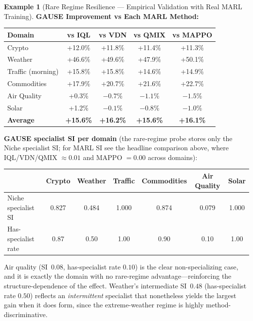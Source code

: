 \documentclass[11pt,a4paper]{article}
\theoremstyle{definition}
\newtheorem{example}{Example}[section]
\theoremstyle{plain}
\begin{document}
\begin{example}[Rare Regime Resilience --- Empirical Validation with Real MARL Training]
\textbf{GAUSE Improvement vs Each MARL Method:}
\begin{center}
\begin{tabular}{lcccc}
\toprule
Domain & vs IQL & vs VDN & vs QMIX & vs MAPPO \\
\midrule
Crypto & +12.0\% & +11.8\% & +11.4\% & +11.3\% \\
Weather & +46.6\% & +49.6\% & +47.9\% & +50.1\% \\
Traffic (morning) & +15.8\% & +15.8\% & +14.6\% & +14.9\% \\
Commodities & +17.9\% & +20.7\% & +21.6\% & +22.7\% \\
Air Quality & +0.3\% & $-0.7$\% & $-1.1$\% & $-1.5$\% \\
Solar & +1.2\% & $-0.1$\% & $-0.8$\% & $-1.0$\% \\
\midrule
\textbf{Average} & \textbf{+15.6\%} & \textbf{+16.2\%} & \textbf{+15.6\%} & \textbf{+16.1\%} \\
\bottomrule
\end{tabular}
\end{center}

\textbf{GAUSE specialist SI per domain} (the rare-regime probe stores
only the Niche specialist SI; for MARL SI see the headline comparison above,
where IQL/VDN/QMIX $\approx 0.01$ and MAPPO $= 0.00$ across domains):
\begin{center}
\begin{tabular}{lcccccc}
\toprule
 & Crypto & Weather & Traffic & Commodities & Air Quality & Solar \\
\midrule
Niche specialist SI & 0.827 & 0.484 & 1.000 & 0.874 & 0.079 & 1.000 \\
Has-specialist rate & 0.87 & 0.50 & 1.00 & 0.90 & 0.10 & 1.00 \\
\bottomrule
\end{tabular}
\end{center}
Air quality (SI~$0.08$, has-specialist rate $0.10$) is the clear non-specializing
case, and it is exactly the domain with no rare-regime advantage---reinforcing the
structure-dependence of the effect. Weather's intermediate SI~$0.48$ (has-specialist
rate $0.50$) reflects an \emph{intermittent} specialist that nonetheless yields the
largest gain when it does form, since the extreme-weather regime is highly
method-discriminative.


\end{example}
\end{document}
